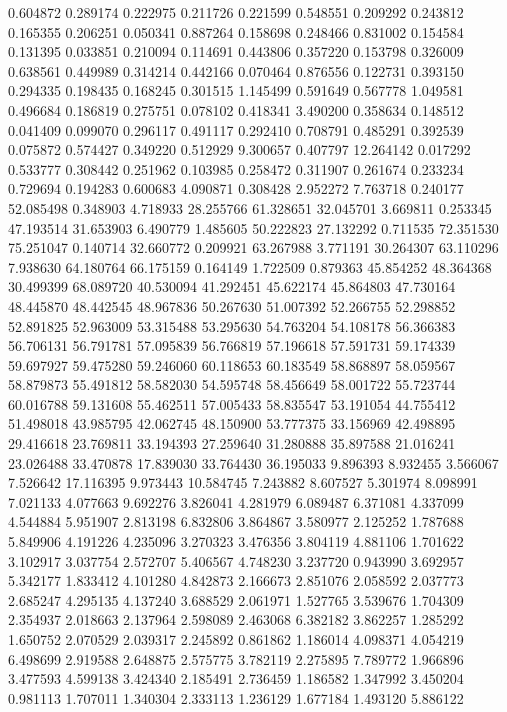 0.604872
0.289174
0.222975
0.211726
0.221599
0.548551
0.209292
0.243812
0.165355
0.206251
0.050341
0.887264
0.158698
0.248466
0.831002
0.154584
0.131395
0.033851
0.210094
0.114691
0.443806
0.357220
0.153798
0.326009
0.638561
0.449989
0.314214
0.442166
0.070464
0.876556
0.122731
0.393150
0.294335
0.198435
0.168245
0.301515
1.145499
0.591649
0.567778
1.049581
0.496684
0.186819
0.275751
0.078102
0.418341
3.490200
0.358634
0.148512
0.041409
0.099070
0.296117
0.491117
0.292410
0.708791
0.485291
0.392539
0.075872
0.574427
0.349220
0.512929
9.300657
0.407797
12.264142
0.017292
0.533777
0.308442
0.251962
0.103985
0.258472
0.311907
0.261674
0.233234
0.729694
0.194283
0.600683
4.090871
0.308428
2.952272
7.763718
0.240177
52.085498
0.348903
4.718933
28.255766
61.328651
32.045701
3.669811
0.253345
47.193514
31.653903
6.490779
1.485605
50.222823
27.132292
0.711535
72.351530
75.251047
0.140714
32.660772
0.209921
63.267988
3.771191
30.264307
63.110296
7.938630
64.180764
66.175159
0.164149
1.722509
0.879363
45.854252
48.364368
30.499399
68.089720
40.530094
41.292451
45.622174
45.864803
47.730164
48.445870
48.442545
48.967836
50.267630
51.007392
52.266755
52.298852
52.891825
52.963009
53.315488
53.295630
54.763204
54.108178
56.366383
56.706131
56.791781
57.095839
56.766819
57.196618
57.591731
59.174339
59.697927
59.475280
59.246060
60.118653
60.183549
58.868897
58.059567
58.879873
55.491812
58.582030
54.595748
58.456649
58.001722
55.723744
60.016788
59.131608
55.462511
57.005433
58.835547
53.191054
44.755412
51.498018
43.985795
42.062745
48.150900
53.777375
33.156969
42.498895
29.416618
23.769811
33.194393
27.259640
31.280888
35.897588
21.016241
23.026488
33.470878
17.839030
33.764430
36.195033
9.896393
8.932455
3.566067
7.526642
17.116395
9.973443
10.584745
7.243882
8.607527
5.301974
8.098991
7.021133
4.077663
9.692276
3.826041
4.281979
6.089487
6.371081
4.337099
4.544884
5.951907
2.813198
6.832806
3.864867
3.580977
2.125252
1.787688
5.849906
4.191226
4.235096
3.270323
3.476356
3.804119
4.881106
1.701622
3.102917
3.037754
2.572707
5.406567
4.748230
3.237720
0.943990
3.692957
5.342177
1.833412
4.101280
4.842873
2.166673
2.851076
2.058592
2.037773
2.685247
4.295135
4.137240
3.688529
2.061971
1.527765
3.539676
1.704309
2.354937
2.018663
2.137964
2.598089
2.463068
6.382182
3.862257
1.285292
1.650752
2.070529
2.039317
2.245892
0.861862
1.186014
4.098371
4.054219
6.498699
2.919588
2.648875
2.575775
3.782119
2.275895
7.789772
1.966896
3.477593
4.599138
3.424340
2.185491
2.736459
1.186582
1.347992
3.450204
0.981113
1.707011
1.340304
2.333113
1.236129
1.677184
1.493120
5.886122
